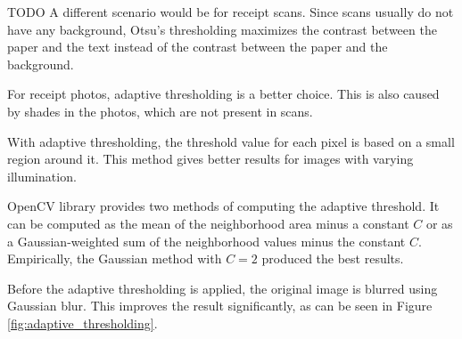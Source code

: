 \documentclass[
  digital, %
  table,   %
  oneside, %
  lof,     %
  lot,     %
]{fithesis3}
\begin{document}
\begin{enumerate}
    TODO A different scenario would be for receipt scans. Since scans usually do not have any background, Otsu's thresholding maximizes the contrast between the paper and the text instead of the contrast between the paper and the background.
    
    For receipt photos, adaptive thresholding is a better choice. This is also caused by shades in the photos, which are not present in scans.
    
    With adaptive thresholding, the threshold value for each pixel is based on a small region around it. This method gives better results for images with varying illumination. \cite{OpenCVThresholding}
    
    OpenCV library provides two methods of computing the adaptive threshold. It can be computed as the mean of the neighborhood area minus a constant $C$ or as a Gaussian-weighted sum of the neighborhood values minus the constant $C$. Empirically, the Gaussian method with $C = 2$ produced the best results.
    
    Before the adaptive thresholding is applied, the original image is blurred using Gaussian blur. This improves the result significantly, as can be seen in Figure \ref{fig:adaptive_thresholding}.
    

\end{enumerate}
\end{document}
